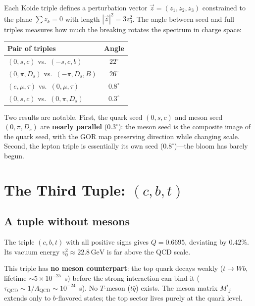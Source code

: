 \documentclass[12pt,a4paper]{article}
\newcommand{\GeV}{\,\text{GeV}}
\begin{document}
Each Koide triple defines a perturbation vector 
$\vec{z} = (z_1, z_2, z_3)$ constrained to the plane $\sum z_k = 0$ 
with length $|\vec{z}|^2 = 3z_0^2$. The angle between seed and 
full triples measures how much the breaking rotates the spectrum 
in charge space:

\begin{center}
\begin{tabular}{lc}
\toprule
Pair of triples & Angle \\
\midrule
$(0,s,c)$ vs.\ $(-s,c,b)$ & $22^\circ$ \\
$(0,\pi,D_s)$ vs.\ $(-\pi,D_s,B)$ & $26^\circ$ \\
$(e,\mu,\tau)$ vs.\ $(0,\mu,\tau)$ & $0.8^\circ$ \\
$(0,s,c)$ vs.\ $(0,\pi,D_s)$ & $0.3^\circ$ \\
\bottomrule
\end{tabular}
\end{center}

Two results are notable. First, the quark seed $(0,s,c)$ and meson 
seed $(0,\pi,D_s)$ are \textbf{nearly parallel} ($0.3^\circ$): the 
meson seed is the composite image of the quark seed, with the GOR 
map preserving direction while changing scale. Second, the lepton 
triple is essentially its own seed ($0.8^\circ$)---the bloom has 
barely begun.

\section{The Third Tuple: $(c, b, t)$}
\label{sec:cbt}

\subsection{A tuple without mesons}

The triple $(c, b, t)$ with all positive signs gives $Q = 0.6695$, 
deviating by $0.42\%$. Its vacuum energy $v_0^2 \approx 22.8\GeV$ 
is far above the QCD scale.

This triple has \textbf{no meson counterpart}: the top quark decays 
weakly ($t \to Wb$, lifetime $\sim 5 \times 10^{-25}$~s) before the 
strong interaction can bind it ($\tau_{\text{QCD}} \sim 1/\Lambda_{\text{QCD}} 
\sim 10^{-24}$~s). No $T$-meson ($t\bar{q}$) exists. The meson matrix 
$M^i{}_j$ extends only to $b$-flavored states; the top sector lives 
purely at the quark level.
\end{document}
